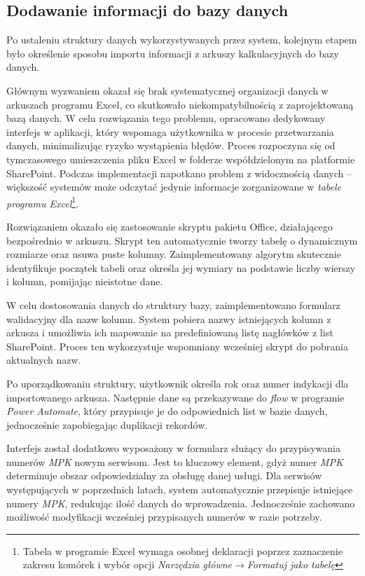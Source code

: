 \subsection{Dodawanie informacji do bazy danych}
Po ustaleniu struktury danych wykorzystywanych przez system, kolejnym etapem było określenie sposobu importu informacji z arkuszy kalkulacyjnych do bazy danych.

Głównym wyzwaniem okazał się brak systematycznej organizacji danych w arkuszach programu Excel, co skutkowało niekompatybilnością z zaprojektowaną bazą danych. 
W celu rozwiązania tego problemu, opracowano dedykowany interfejs w aplikacji, który wspomaga użytkownika w procesie przetwarzania danych, minimalizując ryzyko wystąpienia błędów.
Proces rozpoczyna się od tymczasowego umieszczenia pliku Excel w folderze współdzielonym na platformie SharePoint. Podczas implementacji napotkano problem z widocznością danych -- większość systemów może odczytać jedynie informacje zorganizowane w \emph{tabele programu Excel}\footnote{Tabela w programie Excel wymaga osobnej deklaracji poprzez zaznaczenie zakresu komórek i wybór opcji \emph{Narzędzia główne}$\to$\emph{Formatuj jako tabelę}}.

Rozwiązaniem okazało się zastosowanie skryptu pakietu Office, działającego bezpośrednio w arkuszu. Skrypt ten automatycznie tworzy tabelę o dynamicznym rozmiarze oraz usuwa puste kolumny. Zaimplementowany algorytm skutecznie identyfikuje początek tabeli oraz określa jej wymiary na podstawie liczby wierszy i kolumn, pomijając nieistotne dane.

W celu dostosowania danych do struktury bazy, zaimplementowano formularz walidacyjny dla nazw kolumn. System pobiera nazwy istniejących kolumn z arkusza i umożliwia ich mapowanie na predefiniowaną listę nagłówków z list SharePoint. Proces ten wykorzystuje wspomniany wcześniej skrypt do pobrania aktualnych nazw.

Po uporządkowaniu struktury, użytkownik określa rok oraz numer indykacji dla importowanego arkusza. Następnie dane są przekazywane do \emph{flow} w programie \emph{Power Automate}, który przypisuje je do odpowiednich list w bazie danych, jednocześnie zapobiegając duplikacji rekordów.

Interfejs został dodatkowo wyposażony w formularz służący do przypisywania numerów \emph{MPK} nowym serwisom. Jest to kluczowy element, gdyż numer \emph{MPK} determinuje obszar odpowiedzialny za obsługę danej usługi. Dla serwisów występujących w poprzednich latach, system automatycznie przepisuje istniejące numery \emph{MPK}, redukując ilość danych do wprowadzenia. Jednocześnie zachowano możliwość modyfikacji wcześniej przypisanych numerów w razie potrzeby.